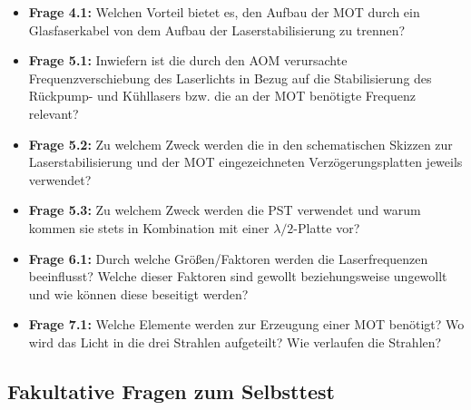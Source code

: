\documentclass[
class=book,
accentcolor=1b,
custommargins=geometry,
fontsize=11pt,
thesis={type=Versuchsanleitung},
ruledheaders=all,
headline=false,
instbox=false,
marginpar=false,
title=small,
ignore-missing-data=true,
twoside=false,
logofile=apqdesign/tuda_logo.pdf,
pdfa=false %
]{apqpub}
\begin{document}
					\begin{itemize}
						\item \textbf{Frage 4.1:} Welchen Vorteil bietet es, den Aufbau der MOT durch ein Glasfaserkabel von dem Aufbau der Laserstabilisierung zu trennen?
						
						\item \textbf{Frage 5.1:} Inwiefern ist die durch den AOM verursachte Frequenzverschiebung des Laserlichts in Bezug auf die Stabilisierung des Rückpump- und Kühllasers bzw. die an der MOT benötigte Frequenz relevant?
						
						\item \textbf{Frage 5.2:} Zu welchem Zweck werden die in den schematischen Skizzen zur Laserstabilisierung und der MOT eingezeichneten Verzögerungsplatten jeweils verwendet?
						
						\item \textbf{Frage 5.3:} Zu welchem Zweck werden die PST verwendet und warum kommen sie stets in Kombination mit einer $\lambda/2$-Platte vor? 
						
						\item \textbf{Frage 6.1:} Durch welche Größen/Faktoren werden die Laserfrequenzen beeinflusst? Welche dieser Faktoren sind gewollt beziehungsweise ungewollt und wie können diese beseitigt werden?
						
						\item \textbf{Frage 7.1:} Welche Elemente werden zur Erzeugung einer MOT benötigt? Wo wird das Licht in die drei Strahlen aufgeteilt? Wie verlaufen die Strahlen?
					\end{itemize}
					
					\subsection{Fakultative Fragen zum Selbsttest}
					
\end{document}
